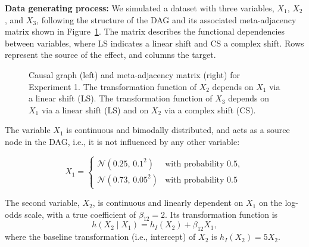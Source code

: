 \textbf{Data generating process: } We simulated a dataset with three variables, $X_1$, $X_2$, and $X_3$, following the structure of the DAG and its associated meta-adjacency matrix shown in Figure~\ref{fig:dag_and_matrix}. The matrix describes the functional dependencies between variables, where LS indicates a linear shift and CS a complex shift. Rows represent the source of the effect, and columns the target.


\begin{figure}[H]
\centering
{}
\caption{Causal graph (left) and meta-adjacency matrix (right) for Experiment 1. The transformation function of $X_2$ depends on $X_1$ via a linear shift (LS). The transformation function of $X_3$ depends on $X_1$ via a linear shift (LS) and on $X_2$ via a complex shift (CS).}
\label{fig:dag_and_matrix}
\end{figure}

The variable $X_1$ is continuous and bimodally distributed, and acts as a source node in the DAG, i.e., it is not influenced by any other variable:

\[
X_1 = 
\begin{cases}
\mathcal{N}(0.25,\, 0.1^2) & \text{with probability } 0.5, \\
\mathcal{N}(0.73,\, 0.05^2) & \text{with probability } 0.5
\end{cases}
\]


    
The second variable, $X_2$, is continuous and linearly dependent on $X_1$ on the log-odds scale, with a true coefficient of $\beta_{12} = 2$. Its transformation function is 
\[
h(X_2 \mid X_1) = h_I(X_2) + \beta_{12} X_1,
\]
where the baseline transformation (i.e., intercept) of $X_2$ is $h_I(X_2) = 5 X_2$.

